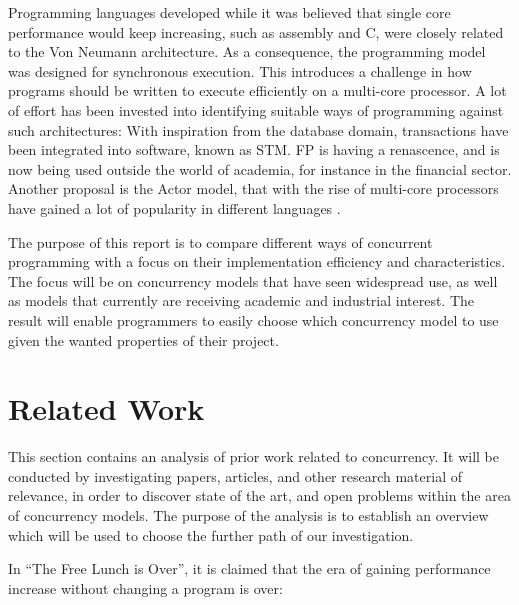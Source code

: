 Programming languages developed while it was believed that single core performance would keep increasing, such as assembly and C, were closely related to the Von Neumann architecture. As a consequence, the programming model was designed for synchronous execution. This introduces a challenge in how programs should be written to execute efficiently on a multi-core processor. A lot of effort has been invested into identifying suitable ways of programming against such architectures: With inspiration from the database domain, transactions have been integrated into software, known as \ac{STM}\cite{shavit1997software}\cite{scherer2005advanced}. \ac{FP} is having a renascence, and is now being used outside the world of academia, for instance in the financial sector\cite{minsky2008caml}. Another proposal is the Actor model\cite{hewitt1973universal}, that with the rise of multi-core processors have gained a lot of popularity in different languages  \cite{haller2007actors}\cite{hewitt2014actor}. 

The purpose of this report is to compare different ways of concurrent programming with a focus on their implementation efficiency and characteristics. The focus will be on concurrency models that have seen widespread use, as well as models that currently are receiving academic and industrial interest. The result will enable programmers to easily choose which concurrency model to use given the wanted properties of their project.

\section{Related Work}\label{sec:relatedwork}
This section contains an analysis of prior work related to concurrency. It will be conducted by investigating papers, articles, and other research material of relevance, in order to discover state of the art, and open problems within the area of concurrency models. The purpose of the analysis is to establish an overview which will be used to choose the further path of our investigation.

In ``The Free Lunch is Over''\cite{sutter2005free}, it is claimed that the era of gaining performance increase without changing a program is over:

